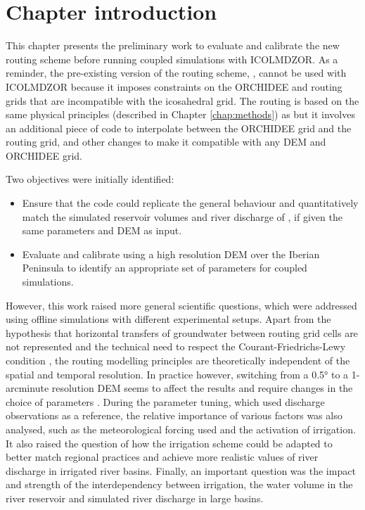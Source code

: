 \section{Chapter introduction}

This chapter presents the preliminary work to evaluate and calibrate the new \native routing scheme before running coupled simulations with ICOLMDZOR. As a reminder, the pre-existing version of the routing scheme, \std, cannot be used with ICOLMDZOR because it imposes constraints on the ORCHIDEE and routing grids that are incompatible with the icosahedral grid. 
The \native routing is based on the same physical principles (described in Chapter \ref{chap:methods}) as \std but it involves an additional piece of code to interpolate between the ORCHIDEE grid and the routing grid, and other changes to make it compatible with any DEM and ORCHIDEE grid.

Two objectives were initially identified:
\begin{itemize}
    \item Ensure that the \native code could replicate the general behaviour and quantitatively match the simulated reservoir volumes and river discharge of \std, if given the same parameters and DEM as input. 
    \item Evaluate and calibrate \native using a high resolution DEM over the Iberian Peninsula to identify an appropriate set of parameters for coupled simulations.
\end{itemize}

However, this work raised more general scientific questions, which were addressed using offline simulations with different experimental setups. Apart from the hypothesis that horizontal transfers of groundwater between routing grid cells are not represented and the technical need to respect the Courant-Friedrichs-Lewy condition \citep{courant_partial_1967}, the routing modelling principles are theoretically independent of the spatial and temporal resolution. In practice however, switching from a 0.5° to a 1-arcminute resolution DEM seems to affect the results and require changes in the choice of parameters \citep{kilic_evaluation_2023}. During the parameter tuning, which used discharge observations as a reference, the relative importance of various factors was also analysed, such as the meteorological forcing used and the activation of irrigation. It also raised the question of how the irrigation scheme could be adapted to better match regional practices and achieve more realistic values of river discharge in irrigated river basins. Finally, an important question was the impact and strength of the interdependency between irrigation, the water volume in the river reservoir and simulated river discharge in large basins.

